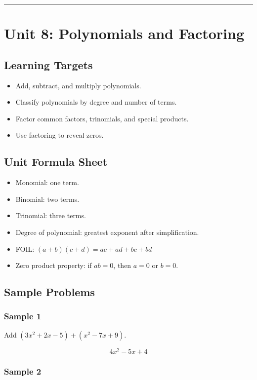 \documentclass[11pt]{book}
\begin{document}
\bigskip\hrule\bigskip

\chapter{Unit 8: Polynomials and Factoring}

\section{Learning Targets}

\begin{itemize}
\item Add, subtract, and multiply polynomials.
\item Classify polynomials by degree and number of terms.
\item Factor common factors, trinomials, and special products.
\item Use factoring to reveal zeros.
\end{itemize}

\section{Unit Formula Sheet}

\begin{itemize}
\item Monomial: one term.
\item Binomial: two terms.
\item Trinomial: three terms.
\item Degree of polynomial: greatest exponent after simplification.
\item FOIL: \((a+b)(c+d)=ac+ad+bc+bd\)
\item Zero product property: if \(ab=0\), then \(a=0\) or \(b=0\).
\end{itemize}

\section{Sample Problems}

\subsection{Sample 1}

Add \((3x^2+2x-5)+(x^2-7x+9)\).

\[4x^2-5x+4\]

\subsection{Sample 2}
\end{document}
